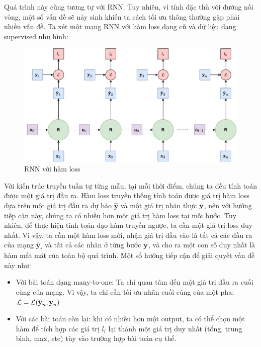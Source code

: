 Quá trình này cũng tương tự với RNN. Tuy nhiên, vì tính đặc thù với đường nối vòng, một số vấn đề sẽ nảy sinh khiến ta cách tối ưu thông thường gặp phải nhiều vấn đề. Ta xét một mạng RNN với hàm loss dạng cũ và dữ liệu dạng supervised như hình:
\begin{figure}[!h]
    \centering
    \includegraphics[width=\textwidth,height=\textheight,keepaspectratio]{chapter06/figure-sec2345/rnn_with_loss.pdf}
    \caption{RNN với hàm loss}
\end{figure}

Với kiến trúc truyền tuần tự từng mẫu, tại mỗi thời điểm, chúng ta đều tính toán được một giá trị đầu ra. Hàm loss truyền thống tính toán được giá trị hàm loss dựa trên một giá trị đầu ra dự báo $\hat{\textbf{y}}$ và một giá trị nhãn thực $\textbf y$, nên với hướng tiếp cận này, chúng ta có nhiều hơn một giá trị hàm loss tại mỗi bước. Tuy nhiên, để thực hiện tính toán đạo hàm truyền ngược, ta cần một giá trị loss duy nhất. Vì vậy, ta cần một hàm loss mới, nhận giá trị đầu vào là tất cả các đầu ra của mạng $\hat{\textbf{y}}_i$ và tất cả các nhãn ở từng bước $\textbf y$, và cho ra một con số duy nhất là hàm mất mát của toàn bộ quá trình. Một số hướng tiếp cận để giải quyết vấn đề này như:
\begin{itemize}
    \item Với bài toán dạng many-to-one: Ta chỉ quan tâm đến một giá trị đầu ra cuối cùng của mạng. Vì vậy, ta chỉ cần tối ưu nhãn cuối cùng của một pha: $\mathcal{L} = \mathcal{L}(\hat{\textbf{y}}_n,\textbf y_n)$
    \item Với các bài toán còn lại: khi có nhiều hơn một output, ta có thể chọn một hàm để tích hợp các giá trị $l_i$ lại thành một giá trị duy nhất (tổng, trung bình, max, etc) tùy vào trường hợp bài toán cụ thể.
\end{itemize}


